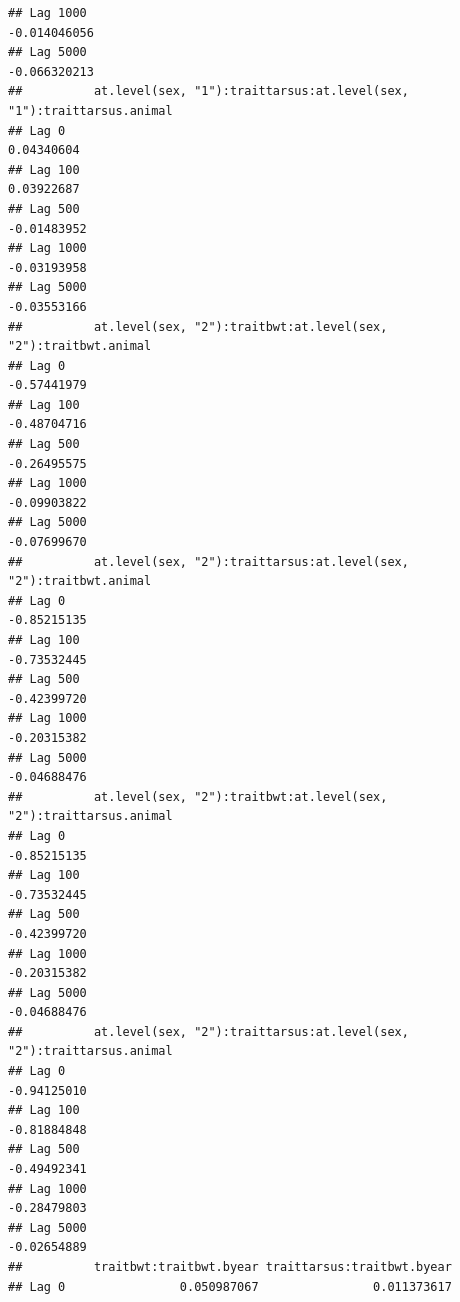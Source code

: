 \documentclass[
  12pt,
]{book}
\begin{document}
\begin{verbatim}
## Lag 1000                                                      -0.014046056
## Lag 5000                                                      -0.066320213
##          at.level(sex, "1"):traittarsus:at.level(sex, "1"):traittarsus.animal
## Lag 0                                                              0.04340604
## Lag 100                                                            0.03922687
## Lag 500                                                           -0.01483952
## Lag 1000                                                          -0.03193958
## Lag 5000                                                          -0.03553166
##          at.level(sex, "2"):traitbwt:at.level(sex, "2"):traitbwt.animal
## Lag 0                                                       -0.57441979
## Lag 100                                                     -0.48704716
## Lag 500                                                     -0.26495575
## Lag 1000                                                    -0.09903822
## Lag 5000                                                    -0.07699670
##          at.level(sex, "2"):traittarsus:at.level(sex, "2"):traitbwt.animal
## Lag 0                                                          -0.85215135
## Lag 100                                                        -0.73532445
## Lag 500                                                        -0.42399720
## Lag 1000                                                       -0.20315382
## Lag 5000                                                       -0.04688476
##          at.level(sex, "2"):traitbwt:at.level(sex, "2"):traittarsus.animal
## Lag 0                                                          -0.85215135
## Lag 100                                                        -0.73532445
## Lag 500                                                        -0.42399720
## Lag 1000                                                       -0.20315382
## Lag 5000                                                       -0.04688476
##          at.level(sex, "2"):traittarsus:at.level(sex, "2"):traittarsus.animal
## Lag 0                                                             -0.94125010
## Lag 100                                                           -0.81884848
## Lag 500                                                           -0.49492341
## Lag 1000                                                          -0.28479803
## Lag 5000                                                          -0.02654889
##          traitbwt:traitbwt.byear traittarsus:traitbwt.byear
## Lag 0                0.050987067                0.011373617

\end{verbatim}
\end{document}
